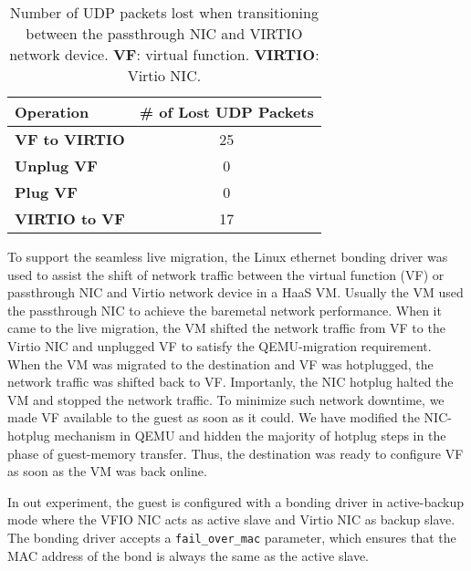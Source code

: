 

\begin{table}[]
\begin{tabular}{|l|c|}
\hline
\textbf{Operation}    & \multicolumn{1}{l|}{\textbf{\# of Lost UDP Packets}} \\ \hline
\textbf{VF to VIRTIO} & 25                                                   \\ \hline
\textbf{Unplug VF}    & 0                                                    \\ \hline
\textbf{Plug VF}      & 0                                                    \\ \hline
\textbf{VIRTIO to VF} & 17                                                   \\ \hline
\end{tabular}
\caption{Number of UDP packets lost when transitioning between
the passthrough NIC and VIRTIO network device. \textbf{VF}:
virtual function. \textbf{VIRTIO}: Virtio NIC.}
\label{tab:udp_packets_lost}
\end{table}

To support the seamless live migration, the Linux ethernet
bonding driver was used to assist the shift of network traffic
between the virtual function (VF) or passthrough NIC and
Virtio network device in a HaaS VM. Usually the VM used the
passthrough NIC to achieve the baremetal network performance.
When it came to the live migration, the VM shifted the network
traffic from VF to the Virtio NIC and unplugged VF to satisfy
the QEMU-migration requirement. When the VM was migrated to
the destination and VF was hotplugged, the network traffic was
shifted back to VF. Importanly, the NIC hotplug halted the VM
and stopped the network traffic. To minimize such network
downtime, we made VF available to the guest as soon as it
could. We have modified the NIC-hotplug mechanism in QEMU and
hidden the majority of hotplug steps in the phase of
guest-memory transfer. Thus, the destination was ready to
configure VF as soon as the VM was back online.





In out experiment, the guest is configured with a bonding
driver in
active-backup mode where the VFIO NIC acts as
active slave and Virtio NIC as
backup slave. The bonding driver accepts a
\texttt{fail\_over\_mac} parameter, which
ensures that the
MAC address of the bond is always the same as the active
slave.

